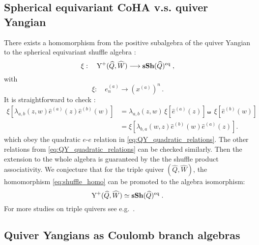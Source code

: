 \documentclass[12pt,a4paper]{article}
\renewcommand{\(}{\left(}
\renewcommand{\)}{\right)}
\renewcommand{\(}{\left(}
\renewcommand{\)}{\right)}
\def\mye{e}
\def\mye{e}
\begin{document}
\medskip

\subsection{Spherical equivariant CoHA v.s. quiver Yangian}


There exists a homomorphism from the positive subalgebra of the quiver Yangian to the spherical equivariant shuffle algebra \cite{Galakhov:2021vbo}:
\begin{equation}\label{eq:shuffle_homo}
\xi:\quad  \textrm{Y}^+(\widehat{Q},\widehat{W})\longrightarrow {\bf sSh}(\widehat{Q})^{\textrm{eq}}\;,
\end{equation}
with
\begin{equation}
\xi: \quad e^{(a)}_{n}\longrightarrow (x^{(a)})^n\,.
\end{equation}
It is straightforward to check \cite{Galakhov:2021vbo}:
\begin{equation}
\begin{split}
\xi\left[\lambda_{a,b}(z,w)\hat\mye^{(a)}(z)\hat\mye^{(b)}(w)\right]&=\lambda_{a,b}(z,w)\,\xi\left[\hat\mye^{(a)}(z)\right]\shuffle\; \xi\left[\hat\mye^{(b)}(w)\right]\\
&=\xi\left[\lambda_{b,a}(w,z)\hat\mye^{(b)}(w)\hat\mye^{(a)}(z)\right].
\end{split}
\end{equation}
which obey the quadratic $e$-$e$ relation in \eqref{eq:QY_quadratic_relations}.
The other relations from \eqref{eq:QY_quadratic_relations} can be checked similarly.
Then the extension to the whole algebra is guaranteed by the the shuffle product associativity. 
We conjecture that for the triple quiver $(\widehat{Q},\widehat{W})$, the homomorphism \eqref{eq:shuffle_homo} can be promoted to the algebra isomorphism:
\begin{equation}
 \textrm{Y}^+(\widehat{Q},\widehat{W})\simeq {\bf sSh}(\widehat{Q})^{\textrm{eq}}\;.
\end{equation}
For more studies on triple quivers see e.g.\ \cite{feigin1995vectorbundlesellipticcurve,enriquez1998correlationfunctionsdrinfeldcurrents,Rapcak:2018nsl,Rapcak:2020ueh,2013arXiv1302.6202N}.


\subsection{Quiver Yangians as Coulomb branch algebras}
\end{document}
